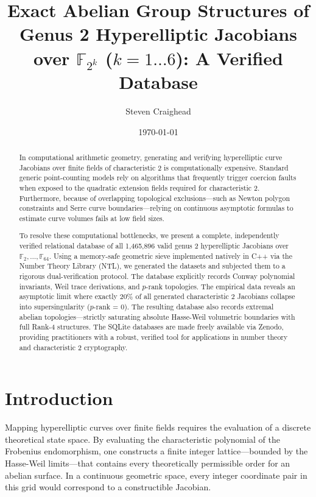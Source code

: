 \documentclass[letterpaper, 11pt]{article}
\title{Exact Abelian Group Structures of Genus 2 Hyperelliptic Jacobians over \texorpdfstring{$\mathbb{F}_{2^k}$}{F\_2\textasciicircum k} (\texorpdfstring{$k=1 \dots 6$}{k=1..6}): A Verified Database}
\author{Steven Craighead}
\date{\today}
\begin{document}
	
	\maketitle
	
	\begin{abstract}
		In computational arithmetic geometry, generating and verifying hyperelliptic curve Jacobians over finite fields of characteristic 2 is computationally expensive. Standard generic point-counting models rely on algorithms that frequently trigger coercion faults when exposed to the quadratic extension fields required for characteristic 2. Furthermore, because of overlapping topological exclusions---such as Newton polygon constraints and Serre curve boundaries---relying on continuous asymptotic formulas to estimate curve volumes fails at low field sizes. 
		
		To resolve these computational bottlenecks, we present a complete, independently verified relational database of all 1,465,896 valid genus 2 hyperelliptic Jacobians over $\mathbb{F}_2, \dots, \mathbb{F}_{64}$. Using a memory-safe geometric sieve implemented natively in C++ via the Number Theory Library (NTL), we generated the datasets and subjected them to a rigorous dual-verification protocol. The database explicitly records Conway polynomial invariants, Weil trace derivations, and $p$-rank topologies. The empirical data reveals an asymptotic limit where exactly 20\% of all generated characteristic 2 Jacobians collapse into supersingularity ($p$-rank = 0). The resulting database also records extremal abelian topologies---strictly saturating absolute Hasse-Weil volumetric boundaries with full Rank-4 structures. The SQLite databases are made freely available via Zenodo, providing practitioners with a robust, verified tool for applications in number theory and characteristic 2 cryptography.
	\end{abstract}
	
	\section{Introduction}
	Mapping hyperelliptic curves over finite fields requires the evaluation of a discrete theoretical state space. By evaluating the characteristic polynomial of the Frobenius endomorphism, one constructs a finite integer lattice---bounded by the Hasse-Weil limits---that contains every theoretically permissible order for an abelian surface. In a continuous geometric space, every integer coordinate pair in this grid would correspond to a constructible Jacobian.
	
\end{document}
